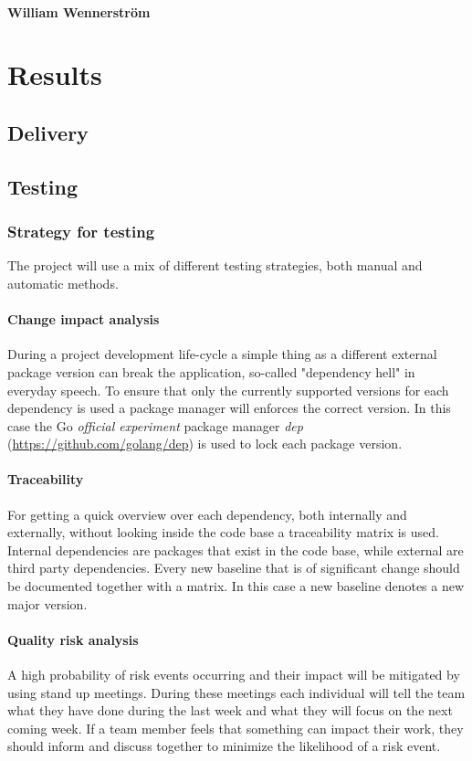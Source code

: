 \documentclass[a4paper,15pt,twoside]{article}
\begin{document}
\paragraph*{William Wennerström}

\newpage
\section{Results}

\subsection{Delivery}%

\subsection{Testing}

\subsubsection{Strategy for testing}
The project will use a mix of different testing strategies, both manual and automatic methods.

\paragraph*{Change impact analysis}
During a project development life-cycle a simple thing as a different external package version can break the application, so-called "dependency hell" in everyday speech. To ensure that only the currently supported versions for each dependency is used a package manager will enforces the correct version. In this case the Go \emph{official experiment} package manager \emph{dep} (\url{https://github.com/golang/dep}) is used to lock each package version.

\paragraph*{Traceability}
For getting a quick overview over each dependency, both internally and externally, without looking inside the code base a traceability matrix is used. Internal dependencies are packages that exist in the code base, while external are third party dependencies. Every new baseline that is of significant change should be documented together with a matrix. In this case a new baseline denotes a new major version.

\paragraph*{Quality risk analysis}
A high probability of risk events occurring and their impact will be mitigated by using stand up meetings. During these meetings each individual will tell the team what they have done during the last week and what they will focus on the next coming week. If a team member feels that something can impact their work, they should inform and discuss together to minimize the likelihood of a risk event.
\end{document}
